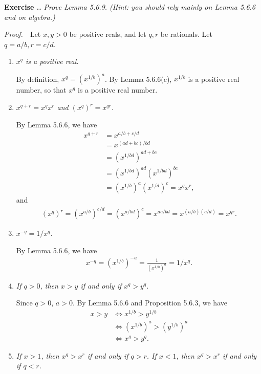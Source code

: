\documentclass{book}
\newcommand{\pff}{\vspace{.25em}\noindent\emph{Proof.}~~}
\newcounter{Exercise}[section]
\renewcommand{\theExercise}{\thesection.\arabic{Exercise}.}
\newcommand{\new}{\vspace{1.5em}\noindent\textbf{{Exercise \stepcounter{Exercise}\textbf{\theExercise}}} }
\begin{document}
\new\emph{Prove Lemma 5.6.9. (Hint: you should rely mainly on Lemma 5.6.6 and on algebra.)}

\pff Let $x,y>$0 be positive reals, and let $q,r$ be rationals. Let $q=a/b,r=c/d$.
\begin{enumerate}
    \item \emph{$x^q$ is a positive real.}

    By definition, $x^q=(x^{1/b})^a$. By Lemma 5.6.6(c), $x^{1/b}$ is a positive real number, so that $x^q$ is a positive real number.

    \item \emph{$x^{q+r}=x^qx^r$ and $(x^q)^r=x^{qr}$.}

    By Lemma 5.6.6, we have
        \begin{align*}
            x^{q+r}
            &=x^{a/b+c/d}\\
            &=x^{(ad+bc)/bd}\\
            &=(x^{1/bd})^{ad+bc}\\
            &=(x^{1/bd})^{ad}(x^{1/bd})^{bc}\\
            &=(x^{1/b})^a(x^{1/d})^c
            =x^qx^r,
        \end{align*}
    and
        \begin{align*}
            (x^q)^r
            =(x^{a/b})^{c/d}
            =(x^{a/bd})^c
            =x^{ac/bd}
            =x^{(a/b)(c/d)}
            =x^{qr}.
        \end{align*}

    \item \emph{$x^{-q}=1/x^q$.}

    By Lemma 5.6.6, we have
        \begin{align*}
            x^{-q}
            =(x^{1/b})^{-a}
            =\frac{1}{(x^{1/b})^a}
            =1/x^q.
        \end{align*}

    \item \emph{If $q>0$, then $x>y$ if and only if $x^q>y^q$.}

    Since $q>0$, $a>0$. By Lemma 5.6.6 and Proposition 5.6.3, we have
        \begin{align*}
            x>y&\iff x^{1/b}>y^{1/b}\\
            &\iff(x^{1/b})^a>(y^{1/b})^a\\
            &\iff x^q>y^q.
        \end{align*}

    \item \emph{If $x>1$, then $x^q>x^r$ if and only if $q>r$. If $x<1$, then $x^q>x^r$ if and only if $q<r$.}


\end{enumerate}
\end{document}
